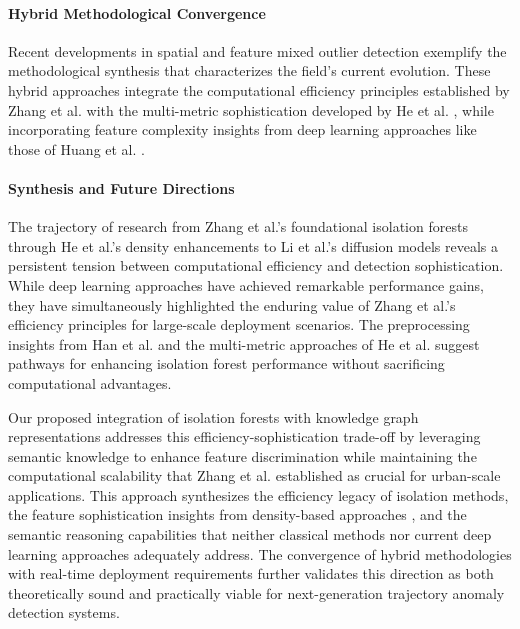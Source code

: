 \documentclass[runningheads]{llncs}
\begin{document}
\paragraph{Hybrid Methodological Convergence}
Recent developments in spatial and feature mixed outlier detection \cite{safety2024spatial} exemplify the methodological synthesis that characterizes the field's current evolution. These hybrid approaches integrate the computational efficiency principles established by Zhang et al. \cite{zhang2011ibat} with the multi-metric sophistication developed by He et al. \cite{he2019based}, while incorporating feature complexity insights from deep learning approaches like those of Huang et al. \cite{huang2021vehicle}.

\paragraph{Synthesis and Future Directions}
The trajectory of research from Zhang et al.'s foundational isolation forests \cite{zhang2011ibat} through He et al.'s density enhancements \cite{he2019based} to Li et al.'s diffusion models \cite{LI2024111387} reveals a persistent tension between computational efficiency and detection sophistication. While deep learning approaches have achieved remarkable performance gains, they have simultaneously highlighted the enduring value of Zhang et al.'s efficiency principles for large-scale deployment scenarios. The preprocessing insights from Han et al. \cite{han2016anomaly} and the multi-metric approaches of He et al. \cite{he2019based} suggest pathways for enhancing isolation forest performance without sacrificing computational advantages.

Our proposed integration of isolation forests with knowledge graph representations addresses this efficiency-sophistication trade-off by leveraging semantic knowledge to enhance feature discrimination while maintaining the computational scalability that Zhang et al. \cite{zhang2011ibat} established as crucial for urban-scale applications. This approach synthesizes the efficiency legacy of isolation methods, the feature sophistication insights from density-based approaches \cite{he2019based}, and the semantic reasoning capabilities that neither classical methods nor current deep learning approaches \cite{LI2024111387} adequately address. The convergence of hybrid methodologies \cite{safety2024spatial} with real-time deployment requirements \cite{hu2024realtime} further validates this direction as both theoretically sound and practically viable for next-generation trajectory anomaly detection systems.
\end{document}
